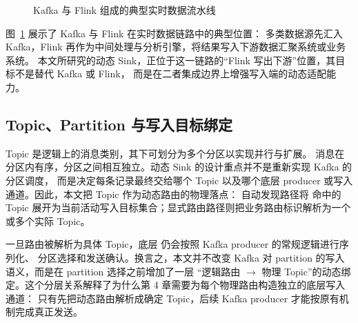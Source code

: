 \begin{figure}[htbp]
  \centering
  \caption{Kafka 与 Flink 组成的典型实时数据流水线}
  \label{fig:kafka-flink-pipeline}
\end{figure}

图~\ref{fig:kafka-flink-pipeline} 展示了 Kafka 与 Flink 在实时数据链路中的典型位置：
多类数据源先汇入 Kafka，Flink 再作为中间处理与分析引擎，将结果写入下游数据汇聚系统或业务系统。
本文所研究的动态 Sink，正位于这一链路的“Flink 写出下游”位置，其目标不是替代 Kafka 或 Flink，
而是在二者集成边界上增强写入端的动态适配能力。

\subsection{Topic、Partition 与写入目标绑定}

Topic 是逻辑上的消息类别，其下可划分为多个分区以实现并行与扩展。
消息在分区内有序，分区之间相互独立。动态 Sink 的设计重点并不是重新实现 Kafka 的分区调度，
而是决定每条记录最终交给哪个 Topic 以及哪个底层 producer 或写入通道。因此，本文把 Topic 作为动态路由的物理落点：
自动发现路径将  命中的 Topic 展开为当前活动写入目标集合；显式路由路径则把业务路由标识解析为一个或多个实际 Topic。

一旦路由被解析为具体 Topic，底层  仍会按照 Kafka producer 的常规逻辑进行序列化、
分区选择和发送确认。换言之，本文并不改变 Kafka 对 partition 的写入语义，而是在 partition 选择之前增加了一层
“逻辑路由 $\rightarrow$ 物理 Topic”的动态绑定。这个分层关系解释了为什么第 4 章需要为每个物理路由构造独立的底层写入通道：
只有先把动态路由解析成确定 Topic，后续 Kafka producer 才能按原有机制完成真正发送。

